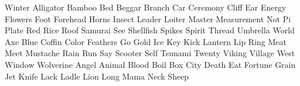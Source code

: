 \documentclass[letterpaper,frontgrid]{flacards}
\begin{document}
        {Winter}
        {Alligator}
        {Bamboo}
        {Bed}
        {Beggar}
        {Branch}
        {Car}
        {Ceremony}
        {Cliff}
        {Ear}
        {Energy}
        {Flowers}
        {Foot}
        {Forehead}
        {Horns}
        {Insect}
        {Leader}
        {Loiter}
        {Master}
        {Measurement}
        {Not}
        {Pi}
        {Plate}
        {Red}
        {Rice}
        {Roof}
        {Samurai}
        {See}
        {Shellfish}
        {Spikes}
        {Spirit}
        {Thread}
        {Umbrella}
        {World}
        {Axe}
        {Blue}
        {Coffin}
        {Color}
        {Feathers}
        {Go}
        {Gold}
        {Ice}
        {Key}
        {Kick}
        {Lantern}
        {Lip Ring}
        {Meat}
        {Meet}
        {Mustache}
        {Rain}
        {Run}
        {Say}
        {Scooter}
        {Self}
        {Tsunami}
        {Twenty}
        {Viking}
        {Village}
        {West}
        {Window}
        {Wolverine}
        {Angel}
        {Animal}
        {Blood}
        {Boil}
        {Box}
        {City}
        {Death}
        {Eat}
        {Fortune}
        {Grain}
        {Jet}
        {Knife}
        {Lack}
        {Ladle}
        {Lion}
        {Long}
        {Mama}
        {Neck}
        {Sheep}
\end{document}
